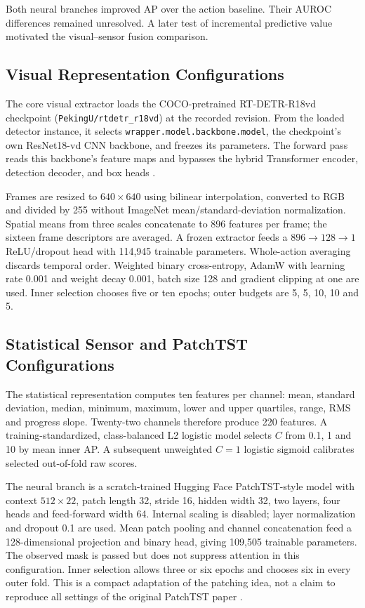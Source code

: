 Both neural branches improved AP over the action baseline. Their AUROC differences
remained unresolved. A later test of incremental predictive value motivated the
visual--sensor fusion comparison.

\subsection{Visual Representation Configurations}
The core visual extractor loads the COCO-pretrained RT-DETR-R18vd checkpoint
(\texttt{PekingU/rtdetr\_r18vd}) at the recorded revision. From the loaded detector
instance, it selects \nolinkurl{wrapper.model.backbone.model}, the checkpoint's own
ResNet18-vd CNN backbone, and freezes its parameters. The forward pass reads this
backbone's feature maps and bypasses the hybrid Transformer encoder, detection decoder,
and box heads \parencite{Zhao2024RTDETR}.

Frames are resized to $640\times640$ using bilinear interpolation, converted to RGB and
divided by 255 without ImageNet mean/standard-deviation normalization. Spatial means
from three scales concatenate to 896 features per frame; the sixteen frame descriptors
are averaged. A frozen extractor feeds a $896\rightarrow128\rightarrow1$ ReLU/dropout
head with 114,945 trainable parameters. Whole-action averaging discards temporal order.
Weighted binary cross-entropy, AdamW with learning rate 0.001 and weight decay 0.001,
batch size 128 and gradient clipping at one are used. Inner selection chooses five or
ten epochs; outer budgets are 5, 5, 10, 10 and 5.

\subsection{Statistical Sensor and PatchTST Configurations}
The statistical representation computes ten features per channel: mean, standard
deviation, median, minimum, maximum, lower and upper quartiles, range, RMS and progress
slope. Twenty-two channels therefore produce 220 features. A training-standardized,
class-balanced L2 logistic model selects $C$ from 0.1, 1 and 10 by mean inner AP. A
subsequent unweighted $C=1$ logistic sigmoid calibrates selected out-of-fold raw scores.

The neural branch is a scratch-trained Hugging Face PatchTST-style model with context
$512\times22$, patch length 32, stride 16, hidden width 32, two layers, four heads and
feed-forward width 64. Internal scaling is disabled; layer normalization and dropout 0.1
are used. Mean patch pooling and channel concatenation feed a 128-dimensional projection
and binary head, giving 109,505 trainable parameters. The observed mask is passed but
does not suppress attention in this configuration. Inner selection allows three or six
epochs and chooses six in every outer fold. This is a compact adaptation of the patching
idea, not a claim to reproduce all settings of the original PatchTST paper
\parencite{Nie2023PatchTST}.

